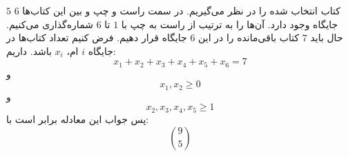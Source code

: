         \p
$5$
کتاب انتخاب شده را در نظر می‌گیریم. در سمت راست و چپ و بین این کتاب‌ها
$6$
جایگاه وجود دارد. آن‌ها را به ترتیب از راست به چپ با
$1$
تا
$6$
شماره‌گذاری می‌کنیم. حال باید
$7$
کتاب باقی‌مانده را در این
$6$
جایگاه قرار دهیم. فرض کنیم تعداد کتاب‌ها در جایگاه
$i$
ام، 
$x_i$
باشد. داریم:
$$x_1 + x_2 + x_3 + x_4 + x_5 + x_6 = 7$$
و
$$x_1, x_2 \geq 0$$
و
$$x_2, x_3, x_4, x_5 \geq 1$$
پس جواب این معادله برابر است با:
$$\binom 9 5$$